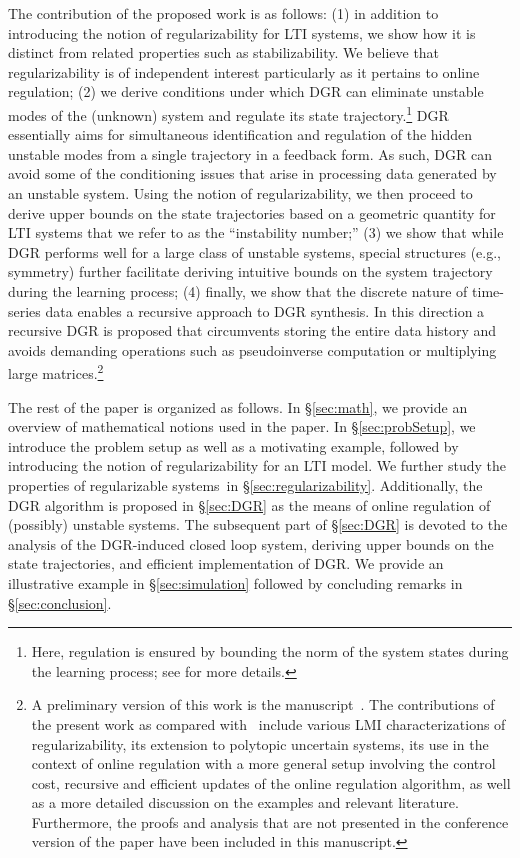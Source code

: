 \documentclass[journal]{IEEEtran}
\theoremstyle{definition}
\theoremstyle{remark}
\begin{document}
	The contribution of the proposed work is as follows:
	(1) in addition to introducing the notion of regularizability for LTI systems, we show how it is distinct from related properties such as stabilizability.
	We believe that regularizability is of independent interest particularly as {\color{violet} it pertains to online regulation};
	(2) we derive conditions under which \ac{DGR} can eliminate unstable modes of the (unknown) system and regulate its state trajectory.\footnote{Here, regulation is ensured by bounding the norm of the system states during the learning process; see  for more details.}
	DGR essentially aims for simultaneous identification and regulation of the hidden unstable modes from a single trajectory in a feedback form.
	As such, \ac{DGR} can avoid some of the conditioning issues
	that arise in processing data generated by an unstable system.
	Using the notion of regularizability, we then proceed to derive upper bounds on the state trajectories based on a geometric quantity for LTI systems that we refer to as the ``instability number;'' 
	(3) we show that while \ac{DGR} performs well for a large class of unstable systems, special structures (e.g., symmetry) further facilitate deriving intuitive bounds on the system trajectory during the learning process;
	(4) finally, we show that the discrete nature of time-series data enables a recursive approach to DGR synthesis.
	In this direction a recursive DGR is proposed that circumvents storing the entire data history and avoids demanding operations such as pseudoinverse computation or multiplying large matrices.\footnote{	
A preliminary version of this work is the manuscript~\cite{talebi2020online}. The contributions of the present work as compared with~\cite{talebi2020online} include various LMI characterizations of regularizability, its extension to polytopic uncertain systems, its use in the context of online regulation with a more general setup involving the control cost, recursive and efficient updates of the online regulation algorithm, as well as a more detailed discussion on the examples and relevant literature. Furthermore, the proofs and analysis that are not presented in the conference version of the paper have been included in this manuscript.}

	The rest of the paper is organized as follows.
	In \S\ref{sec:math}, we provide an overview of mathematical notions 
	used in the paper.
	In \S\ref{sec:probSetup}, we introduce the problem setup as well as a motivating example, followed
	by introducing the notion of regularizability for an LTI model.
	We further study the properties of regularizable systems~in \S\ref{sec:regularizability}.
	Additionally, the \ac{DGR} algorithm is proposed in \S\ref{sec:DGR} as the
 means of online regulation of (possibly) unstable systems.
	The subsequent part of \S\ref{sec:DGR} is devoted to the analysis of the {DGR-induced} closed loop system, deriving upper bounds on the state trajectories, and efficient implementation of \ac{DGR}.
	We provide an illustrative example in \S\ref{sec:simulation} followed by
	concluding remarks in \S\ref{sec:conclusion}.
\end{document}
